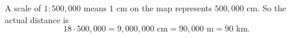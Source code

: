 A scale of $1:500{,}000$ means $1$ cm on the map represents $500{,}000$ cm. So the actual distance is
\[
18\cdot500{,}000=9{,}000{,}000\text{ cm}=90{,}000\text{ m}=\boxed{90\text{ km}} .
\]

